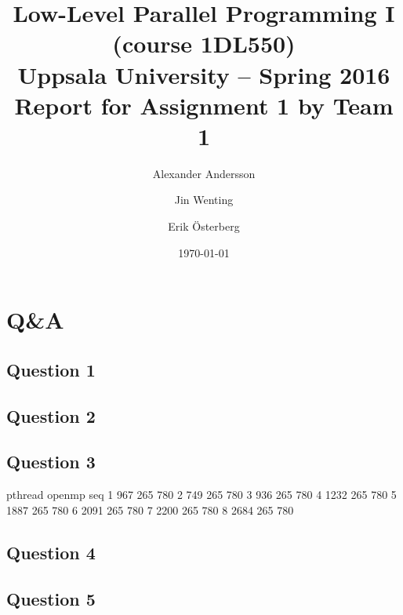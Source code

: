 \documentclass[a4paper,11pt]{article}
\title{\textbf{Low-Level Parallel Programming I (course 1DL550) \\
    Uppsala University -- Spring 2016 \\
    Report for Assignment 1 by Team 1
  }
}
\author{Alexander Andersson \and Jin Wenting \and Erik Österberg}
\date{\today}
\begin{document}
\maketitle

\section{Q\&A}

\subsection{Question 1}

\subsection{Question 2}

\subsection{Question 3}

	pthread	openmp	seq
1	967	265	780
2	749	265	780
3	936	265	780
4	1232	265	780
5	1887	265	780
6	2091	265	780
7	2200	265	780
8	2684	265	780

\subsection{Question 4}

\subsection{Question 5}

\clearpage


%
%




\end{document}
